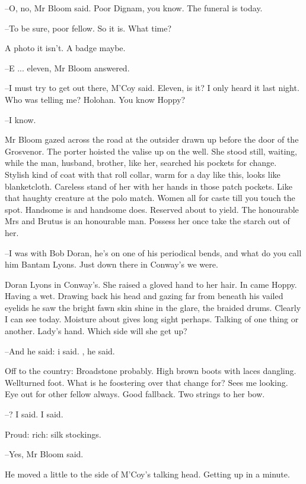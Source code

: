 --O, no, Mr Bloom said.
Poor Dignam, you know.
The funeral is today.

--To be sure, poor fellow.
So it is.
What time?

A photo it isn't.
A badge maybe.

--E ... eleven,
Mr Bloom answered.

--I must try to get out there,
M'Coy said.
Eleven, is it?
I only heard it last night.
Who was telling me?
Holohan.
You know Hoppy?

--I know.

Mr Bloom gazed across the road at the outsider
drawn up before the door of the Grosvenor.
The porter hoisted the valise up on the well.
She stood still, waiting,
while the man, husband, brother,
like her,
searched his pockets for change.
Stylish kind of coat with that roll collar,
warm for a day like this,
looks like blanketcloth.
Careless stand of her
with her hands in those patch pockets.
Like that haughty creature at the polo match.
Women all for caste till you touch the spot.
Handsome is and handsome does.
Reserved about to yield.
The honourable Mrs
and Brutus is an honourable man.
Possess her once
take the starch out of her.

--I was with Bob Doran,
he's on one of his periodical bends,
and what do you call him Bantam Lyons.
Just down there in Conway's
we were.

Doran Lyons in Conway's.
She raised a gloved hand to her hair.
In came Hoppy.
Having a wet.
Drawing back his head
and gazing far from beneath
his vailed eyelids
he saw the bright fawn skin shine in the glare,
the braided drums.
Clearly I can see today.
Moisture about gives long sight perhaps.
Talking of one thing or another.
Lady's hand.
Which side will she get up?

--And he said:
 i said.
,
he said.

Off to the country:
Broadstone probably.
High brown boots with laces dangling.
Wellturned foot.
What is he foostering over that change for?
Sees me looking.
Eye out for other fellow always.
Good fallback.
Two strings to her bow.

--?
I said.
I said.

Proud:
rich:
silk stockings.

--Yes,
Mr Bloom said.

He moved a little to the side of M'Coy's talking head.
Getting up in a minute.

